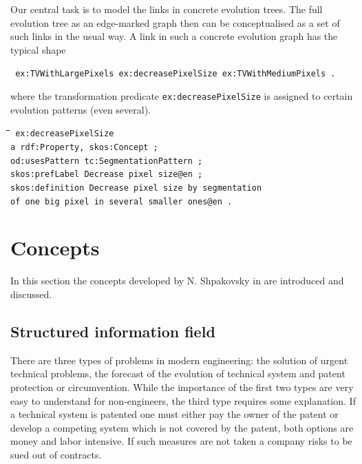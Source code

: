 \documentclass[11pt,a4paper]{article}
\newenvironment{code}{\tt \begin{tabbing}
\hskip12pt\=\hskip12pt\=\hskip12pt\=\hskip12pt\=\hskip5cm\=\hskip5cm\=\kill}
{\end{tabbing}}
\def\dq{{\char34}}
\begin{document}
Our central task is to model the links in concrete evolution trees. The
full evolution tree as an edge-marked graph then can be conceptualised as a
set of such links in the usual way.  A link in such a concrete evolution graph
has the typical shape
\begin{center}\tt
  ex:TVWithLargePixels ex:decreasePixelSize ex:TVWithMediumPixels .
\end{center}
where the transformation predicate \texttt{ex:decreasePixelSize} is assigned
to certain evolution patterns (even several).
\begin{code}\tt
ex:decreasePixelSize \\
\> a rdf:Property, skos:Concept ; \\
\> od:usesPattern tc:SegmentationPattern ; \\
\> skos:prefLabel {\dq}Decrease pixel size{\dq}@en ; \\
\> skos:definition {\dq}{\dq}{\dq}Decrease pixel size by segmentation \\
\>\> of one big pixel in several smaller ones{\dq}{\dq}{\dq}@en .
\end{code}

\section{Concepts}

In this section the concepts developed by N. Shpakovsky in
\cite{Shpakovsky2016} are introduced and discussed.

\subsection{Structured information field}

There are three types of problems in modern engineering: the solution of
urgent technical problems, the forecast of the evolution of technical system
and patent protection or circumvention. While the importance of the first two
types are very easy to understand for non-engineers, the third type requires
some explanation. If a technical system is patented one must either pay the
owner of the patent or develop a competing system which is not covered by the
patent, both options are money and labor intensive. If such measures are not
taken a company risks to be sued out of contracts.
\end{document}
